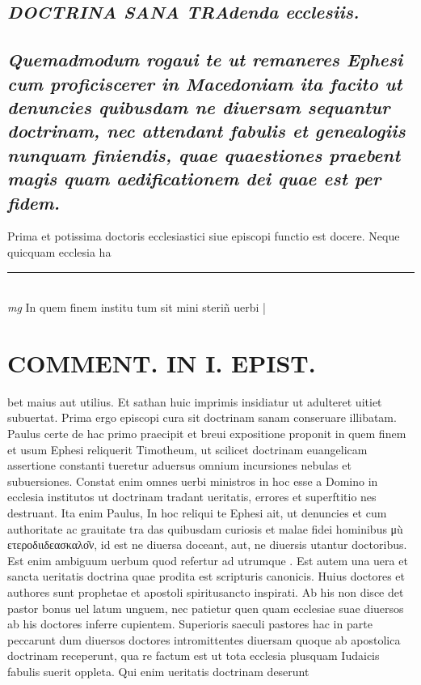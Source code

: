 \documentclass{article}
\begin{document}
\begin{pages}
\subsection*{\textit{DOCTRINA SANA TRAdenda ecclesiis. }}
{}
\subsection*{\textit{Quemadmodum rogaui te ut remaneres Ephesi cum proficiscerer in Macedoniam ita facito ut denuncies quibusdam ne diuersam sequantur doctrinam, nec attendant fabulis et genealogiis nunquam finiendis, quae quaestiones praebent magis quam aedificationem dei quae est per fidem. }}\pstart Prima et potissima doctoris ecclesiastici siue episcopi functio est docere. Neque quicquam ecclesia ha\pend
\vspace{0.5cm}\noindent
\vspace{0.2cm}\rule{1cm}{0.2pt}\\ 
\hspace{0.2cm}\textit{mg}
\footnotesize In quem finem institu tum sit mini steriñ uerbi 
\normalsize| 
\section*{COMMENT. IN I. EPIST. }\pstart bet maius aut utilius. Et sathan huic imprimis insidiatur ut adulteret uitiet subuertat. Prima ergo episcopi cura sit doctrinam sanam conseruare illibatam. Paulus certe de hac primo praecipit et breui expositione proponit in quem finem et usum Ephesi reliquerit Timotheum, ut scilicet doctrinam euangelicam assertione constanti tueretur aduersus omnium incursiones nebulas et subuersiones. Constat enim omnes uerbi ministros in hoc esse a Domino in ecclesia institutos ut doctrinam tradant ueritatis, errores et superftitio nes destruant. Ita enim Paulus, In hoc reliqui te Ephesi ait, ut denuncies et cum authoritate ac grauitate tra das quibusdam curiosis et malae fidei hominibus μù ετεροδιιδεασκαλο͂ν, id est ne diuersa doceant, aut, ne diuersis utantur doctoribus. Est enim ambiguum uerbum quod refertur ad utrumque . Est autem una uera et sancta ueritatis doctrina quae prodita est scripturis canonicis. Huius doctores et authores sunt prophetae et apostoli spiritusancto inspirati. Ab his non disce det pastor bonus uel latum unguem, nec patietur quen quam ecclesiae suae diuersos ab his doctores inferre cupientem. Superioris saeculi pastores hac in parte peccarunt dum diuersos doctores intromittentes diuersam quoque ab apostolica doctrinam receperunt, qua re factum est ut tota ecclesia plusquam Iudaicis fabulis suerit oppleta. Qui enim ueritatis doctrinam deserunt  \pend

\end{pages}
\end{document}
